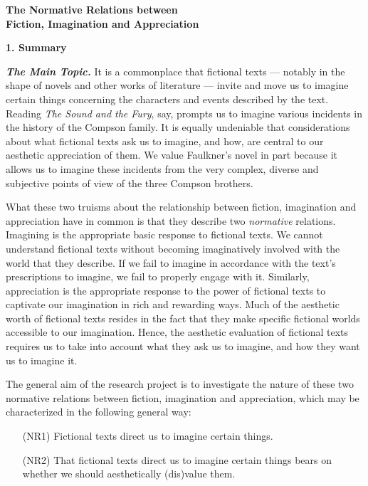 \begin{center}
\noindent\textbf{\large The Normative Relations between\\ Fiction, Imagination and
Appreciation}
\end{center}


\noindent\textbf{\large 1. Summary}
\vspace{.1cm}

\noindent \textbf{\emph{The Main Topic.}} It is a commonplace that fictional texts --- notably in the shape of novels and other works of literature --- invite and move us to imagine certain things concerning the characters and events described by the text. Reading \emph{The Sound and the Fury}, say, prompts us to imagine various incidents in the history of the Compson family. It is equally undeniable that considerations about what fictional texts ask us to imagine, and how, are central to our aesthetic appreciation of them. We value Faulkner's novel in part because it allows us to imagine these incidents from the very complex, diverse and subjective points of view of the three Compson brothers.

What these two truisms about the relationship between fiction, imagination and appreciation have in common is that they describe two \emph{normative} relations. Imagining is the appropriate basic response to fictional texts. We cannot understand fictional texts without becoming imaginatively involved with the world that they describe. If we fail to imagine in accordance with the text's prescriptions to imagine, we fail to properly engage with it. Similarly, appreciation is the appropriate response to the power of fictional texts to captivate our imagination in rich and rewarding ways. Much of the aesthetic worth of fictional texts resides in the fact that they make specific fictional worlds accessible to our imagination. Hence, the aesthetic evaluation of fictional texts requires us to take into account what they ask us to imagine, and how they want us to imagine it.

The general aim of the research project is to investigate the nature of these two normative relations between fiction, imagination and appreciation, which may be characterized in the following general way:


\vspace{-.1cm}
\begin{itemize}[leftmargin=2cm]
\item[{(NR1)}] Fictional texts direct us to imagine certain things.
\vspace{-.2cm}
\item[{(NR2)}] That fictional texts direct us to imagine certain things bears on whether we should aesthetically (dis)value them. 
\end{itemize}
\vspace{-.1cm}


